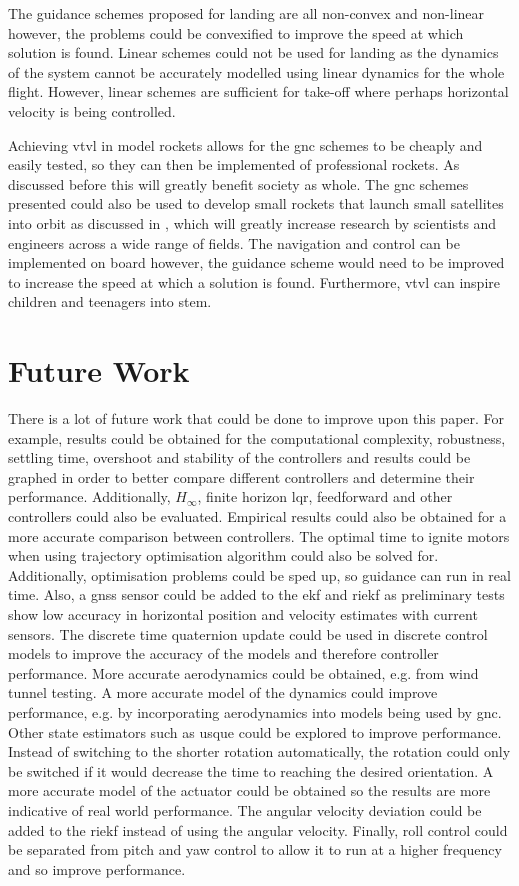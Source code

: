 \documentclass{article}
\begin{document}
The guidance schemes proposed for landing are all non-convex and non-linear however, the problems could be convexified to improve the speed at which solution is found.
Linear schemes could not be used for landing as the dynamics of the system cannot be accurately modelled using linear dynamics for the whole flight.
However, linear schemes are sufficient for take-off where perhaps horizontal velocity is being controlled.

Achieving \gls{vtvl} in model rockets allows for the \gls{gnc} schemes to be cheaply and easily tested, so they can then be implemented of professional rockets.
As discussed before this will greatly benefit society as whole.
The \gls{gnc} schemes presented could also be used to develop small rockets that launch small satellites into orbit as discussed in \cite{Kehl2015}, which will greatly increase research by scientists and engineers across a wide range of fields.
The navigation and control can be implemented on board however, the guidance scheme would need to be improved to increase the speed at which a solution is found. 
Furthermore, \gls{vtvl} can inspire children and teenagers into \gls{stem}.

\section{Future Work}
There is a lot of future work that could be done to improve upon this paper. 
For example, results could be obtained for the computational complexity, robustness, settling time, overshoot and stability of the controllers and results could be graphed in order to better compare different controllers and determine their performance.
Additionally, $H_\infty$, finite horizon \gls{lqr}, feedforward and other controllers could also be evaluated.
Empirical results could also be obtained for a more accurate comparison between controllers.
The optimal time to ignite motors when using trajectory optimisation algorithm could also be solved for.
Additionally, optimisation problems could be sped up, so guidance can run in real time.
Also, a \gls{gnss} sensor could be added to the \gls{ekf} and \gls{riekf} as preliminary tests show low accuracy in horizontal position and velocity estimates with current sensors.
The discrete time quaternion update could be used in discrete control models to improve the accuracy of the models and therefore controller performance.
More accurate aerodynamics could be obtained, e.g. from wind tunnel testing. A more accurate model of the dynamics could improve performance, e.g. by incorporating aerodynamics into models being used by \gls{gnc}.
Other state estimators such as \gls{usque} could be explored to improve performance.
Instead of switching to the shorter rotation automatically, the rotation could only be switched if it would decrease the time to reaching the desired orientation.
A more accurate model of the actuator could be obtained so the results are more indicative of real world performance.
The angular velocity deviation could be added to the \gls{riekf} instead of using the angular velocity.
Finally, roll control could be separated from pitch and yaw control to allow it to run at a higher frequency and so improve performance.
\newpage
\appendix
\end{document}
